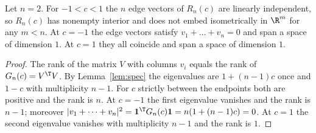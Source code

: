 \begin{theorem}\label{thm:main}
Let $n=2$. For $-1<c<1$ the $n$ edge vectors of $R_n(c)$ are linearly independent, so $R_n(c)$ has nonempty interior and does not embed isometrically in $\R^m$ for any $m<n$.
At $c=-1$ the edge vectors satisfy $v_1+\dots+v_n=0$ and span a space of dimension $1$.
At $c=1$ they all coincide and span a space of dimension $1$.
\end{theorem}
\begin{proof}
The rank of the matrix $V$ with columns $v_i$ equals the rank of $G_n(c)=V^\T V$.
By Lemma~\ref{lem:spec} the eigenvalues are $1+(n-1)c$ once and $1-c$ with multiplicity $n-1$.
For $c$ strictly between the endpoints both are positive and the rank is $n$.
At $c=-1$ the first eigenvalue vanishes and the rank is $n-1$; moreover $|v_1+\dots+v_n|^2=\mathbf 1^\T G_n(c)\mathbf 1=n(1+(n-1)c)=0$.
At $c=1$ the second eigenvalue vanishes with multiplicity $n-1$ and the rank is $1$.
\end{proof}
